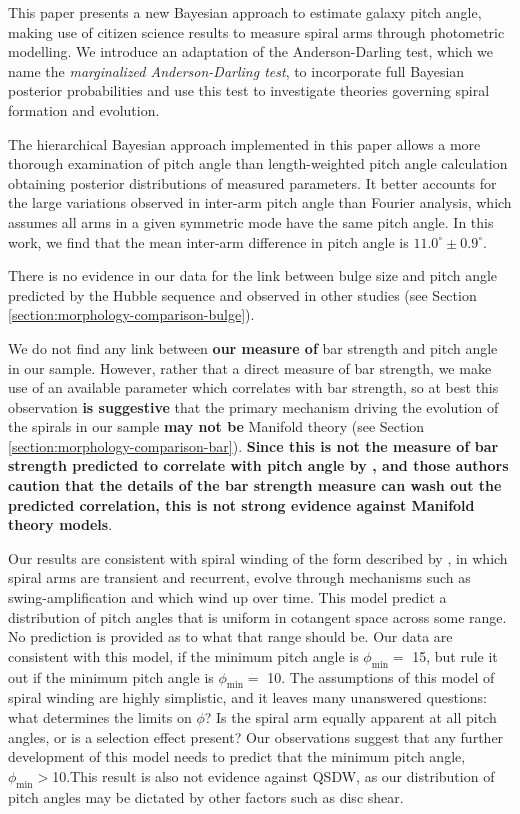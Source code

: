 \label{section:summary}
This paper presents a new Bayesian approach to estimate galaxy pitch angle, making use of citizen science results to measure spiral arms through photometric modelling. We introduce an adaptation of the Anderson-Darling test, which we name the \textit{marginalized Anderson-Darling test}, to incorporate full Bayesian posterior probabilities and use this test to investigate theories governing spiral formation and evolution.

The hierarchical Bayesian approach implemented in this paper allows a more thorough examination of pitch angle than length-weighted pitch angle calculation obtaining posterior distributions of measured parameters. It better accounts for the large variations observed in inter-arm pitch angle than Fourier analysis, which assumes all arms in a given symmetric mode have the same pitch angle. In this work, we find that the mean inter-arm difference in pitch angle is $11.0^\circ\pm 0.9^\circ$.

There is no evidence in our data for the link between bulge size and pitch angle predicted by the Hubble sequence and observed in other studies (see Section \ref{section:morphology-comparison-bulge}).

We do not find any link between {\bf our measure of} bar strength and pitch angle in our sample. However, rather that a direct measure of bar strength, we make use of an available parameter which correlates with bar strength, so at best this observation {\bf is suggestive} that the primary mechanism driving the evolution of the spirals in our sample {\bf may not be} Manifold theory (see Section \ref{section:morphology-comparison-bar}). \textbf{Since this is not the measure of bar strength predicted to correlate with pitch angle by \citet{2009MNRAS.400.1706A}, and those authors caution that the details of the bar strength measure can wash out the predicted correlation, this is not strong evidence against Manifold theory models}. 

Our results are consistent with spiral winding of the form described by \citet{2019arXiv190910291P}, in which spiral arms are transient and recurrent, evolve through mechanisms such as swing-amplification \citep{1965MNRAS.130..125G} and which wind up over time. This model predict a distribution of pitch angles that is uniform in cotangent space across some range. No prediction is provided as to what that range should be. Our data are consistent with this model, if the minimum pitch angle is $\phi_\mathrm{min} = $ {15\degree}, but rule it out if the minimum pitch angle is $\phi_\mathrm{min} = $ {10\degree}. The assumptions of this model of spiral winding are highly simplistic, and it leaves many unanswered questions: what determines the limits on $\phi$? Is the spiral arm equally apparent at all pitch angles, or is a selection effect present? Our observations suggest that any further development of this model needs to predict that the minimum pitch angle, $\phi_\mathrm{min}>${10\degree}.This result is also not evidence against QSDW, as our distribution of pitch angles may be dictated by other factors such as disc shear.

